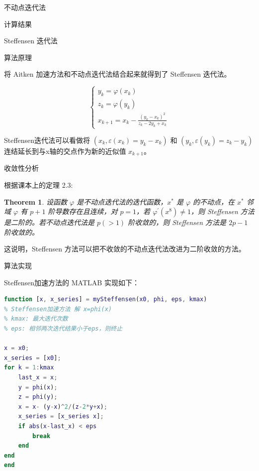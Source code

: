 \documentclass[a4paper]{article}
\newtheorem{myThm}{Theorem}
\begin{document}
\begin{multicols}{2}
\begin{section}{不动点迭代法}
\begin{subsection}{计算结果}
	\end{subsection}

\end{section}


\begin{section}{Steffensen 迭代法}

	\begin{subsection}{算法原理}
		
		将 Aitken 加速方法和不动点迭代法结合起来就得到了 Steffensen 迭代法。
		
		$$\left\{\begin{array}{l}{y_{k}=\varphi\left(x_{k}\right)} \\ {z_{k}=\varphi\left(y_{k}\right)} \\ {x_{k+1}=x_{k}-\frac{\left(y_{k}-x_{k}\right)^{2}}{z_{k}-2 y_{k}+x_{k}}}\end{array}\right.$$
		
		Steffensen迭代法可以看做将 $(x_k, \varepsilon(x_k)=y_k-x_k )$ 和 $(y_k, \varepsilon(y_k)=z_k-y_k )$ 连结延长到与x轴的交点作为新的近似值 $x_{k+1}$。
		
	\end{subsection}

	\begin{subsection}{收敛性分析}
		
		根据课本上的定理 2.3:
		
		\begin{myThm}
			设函数 $\varphi$ 是不动点迭代法的迭代函数，$x^*$ 是 $\varphi$ 的不动点，在 $x^*$ 邻域 $\varphi$ 有 $p+1$ 阶导数存在且连续，对 $p=1$，若 $\varphi^\prime(x^8)\neq 1$，则 Steffensen 方法是二阶的。若不动点迭代法是 $p(>1)$ 阶收敛的，则 Steffensen 方法是 $2p-1$ 阶收敛的。 
		\end{myThm}
		
		这说明，Steffensen 方法可以把不收敛的不动点迭代法改进为二阶收敛的方法。
		
	\end{subsection}
	
	\begin{subsection}{算法实现}
	
		Steffensen加速方法的 MATLAB 实现如下：
		
		\begin{lstlisting}[language=Matlab]
function [x, x_series] = mySteffensen(x0, phi, eps, kmax)
% Steffensen加速方法 解 x=phi(x)
% kmax: 最大迭代次数
% eps: 相邻两次迭代结果小于eps，则终止

x = x0;
x_series = [x0];
for k = 1:kmax
    last_x = x;
    y = phi(x);
    z = phi(y);
    x = x- (y-x)^2/(z-2*y+x);
    x_series = [x_series x];
    if abs(x-last_x) < eps
        break
    end
end
end	
		\end{lstlisting}


\end{subsection}
\end{section}
\end{multicols}
\end{document}
